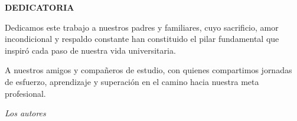 \ifmostrardedicatoria
  \newpage
  \thispagestyle{estiloresponsables}

  \begin{center}
    {\fontsize{14pt}{18pt}\selectfont \textbf{DEDICATORIA}}
  \end{center}

  \vspace{0.8cm}

  Dedicamos este trabajo a nuestros padres y familiares, cuyo sacrificio, amor incondicional y respaldo constante han constituido el pilar fundamental que inspiró cada paso de nuestra vida universitaria.

  A nuestros amigos y compañeros de estudio, con quienes compartimos jornadas de esfuerzo, aprendizaje y superación en el camino hacia nuestra meta profesional.

  \vspace{1.5cm}

  \begin{flushright}
    \textit{Los autores}
  \end{flushright}

  \vfill
  \newpage
\fi
